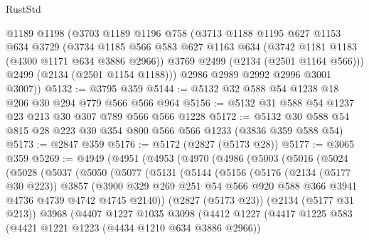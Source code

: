 \begin{lexlean}{RustStd}
\begin{coremodule}
      @1189
      @1198
      (@3703
        @1189
        @1196
        @758
        (@3713
          @1188
          @1195
          @627
          @1153
          @634
          @3729
          (@3734
            @1185
            @566
            @583
            @627
            @1163
            @634
            (@3742 @1181 @1183 (@4300 @1171 @634 @3886 @2966))
            @3769
            @2499
            (@2134 (@2501 @1164 @566)))
          @2499
          (@2134 (@2501 @1154 @1188)))
        @2986
        @2989
        @2992
        @2996
        @3001
        @3007))
@5132 := @3795 @359
@5144 := @5132 @32 @588 @54 @1238 @18 @206 @30 @294 @779 @566 @566 @964
@5156 := @5132 @31 @588 @54 @1237 @23 @213 @30 @307 @789 @566 @566 @1228
@5172 := @5132 @30 @588 @54 @815 @28 @223 @30 @354 @800 @566 @566 @1233 (@3836 @359 @588 @54)
@5173 := @2847 @359
@5176 := @5172 (@2827 (@5173 @28))
@5177 := @3065 @359
@5269 := @4949
    (@4951
      (@4953
        (@4970
          (@4986
            (@5003
              (@5016
                (@5024
                  (@5028
                    (@5037
                      (@5050
                        (@5077
                          (@5131
                            (@5144
                              (@5156
                                (@5176
                                  (@2134 (@5177 @30 @223))
                                  @3857
                                  (@3900
                                    @329
                                    @269
                                    @251
                                    @54
                                    @566
                                    @920
                                    @588
                                    @366
                                    @3941
                                    @4736
                                    @4739
                                    @4742
                                    @4745
                                    @2140))
                                (@2827 (@5173 @23))
                                (@2134 (@5177 @31 @213))
                                @3968
                                (@4407
                                  @1227
                                  @1035
                                  @3098
                                  (@4412
                                    @1227
                                    (@4417
                                      @1225
                                      @583
                                      (@4421 @1221 @1223 (@4434 @1210 @634 @3886 @2966))

\end{coremodule}
\end{lexlean}
